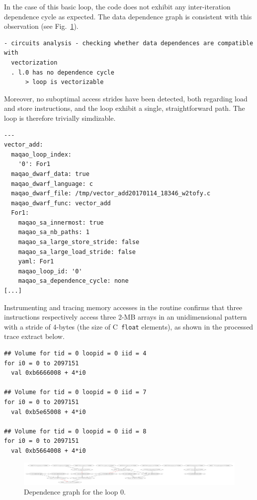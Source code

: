 \documentclass[11pt, a4paper, twoside]{montblanc2}
\begin{document}
In the case of this basic loop, the code does not exhibit any inter-iteration 
dependence cycle as expected. The data dependence graph is consistent with this 
observation (see Fig.~\ref{fig:dg_vec_add}).

\begin{verbatim}
- circuits analysis - checking whether data dependences are compatible with 
  vectorization
  . l.0 has no dependence cycle
      > loop is vectorizable
\end{verbatim}

Moreover, no suboptimal access strides have been detected, both regarding load 
and store instructions, and the loop exhibit a single, straightforward path. The 
loop is therefore trivially simdizable.

\begin{verbatim}
---
vector_add:
  maqao_loop_index:
    '0': For1
  maqao_dwarf_data: true
  maqao_dwarf_language: c
  maqao_dwarf_file: /tmp/vector_add20170114_18346_w2tofy.c
  maqao_dwarf_func: vector_add
  For1:
    maqao_sa_innermost: true
    maqao_sa_nb_paths: 1
    maqao_sa_large_store_stride: false
    maqao_sa_large_load_stride: false
    yaml: For1
    maqao_loop_id: '0'
    maqao_sa_dependence_cycle: none
[...]
\end{verbatim}

Instrumenting and tracing memory accesses in the routine confirms that three 
instructions respectively access three 2-MB arrays in an unidimensional pattern 
with a stride of 4-bytes (the size of C~\texttt{float} elements), as shown in 
the processed trace extract below.

\begin{verbatim}
## Volume for tid = 0 loopid = 0 iid = 4
for i0 = 0 to 2097151
  val 0xb6666008 + 4*i0

## Volume for tid = 0 loopid = 0 iid = 7
for i0 = 0 to 2097151
  val 0xb5e65008 + 4*i0

## Volume for tid = 0 loopid = 0 iid = 8
for i0 = 0 to 2097151
  val 0xb5664008 + 4*i0
\end{verbatim}

\begin{figure}[h]
  \centering
\includegraphics[width=1\textwidth]{fvector_add_l0}
\caption{Dependence graph for the loop 0.}\label{fig:dg_vec_add}
\end{figure}
\end{document}
